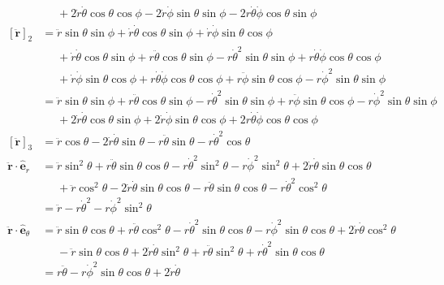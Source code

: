 \documentclass[12pt]{article}
\begin{document}
\begin{gather*}
\begin{aligned}
			&\phantom{=} 
				+ 2\dot{r}\dot{\theta}\cos\theta\cos\phi
				- 2\dot{r}\dot{\phi}\sin\theta\sin\phi 
				- 2r\dot{\theta}\dot{\phi}\cos\theta\sin\phi \\
		[\ddot{\mathbf{r}}]_2 &= 
			\ddot{r}\sin\theta\sin\phi + \dot{r}\dot{\theta}\cos\theta\sin\phi
				+ \dot{r}\dot{\phi}\sin\theta\cos\phi \\
			&\phantom{=} + \dot{r}\dot{\theta}\cos\theta\sin\phi 
				+ r\ddot{\theta}\cos\theta\sin\phi - r\dot{\theta}^2\sin\theta\sin\phi 
				+ r\dot{\theta}\dot{\phi}\cos\theta\cos\phi \\
			&\phantom{=}+ \dot{r}\dot{\phi}\sin\theta\cos\phi
				+ r\dot{\theta}\dot{\phi}\cos\theta\cos\phi 
				+ r\ddot{\phi}\sin\theta\cos\phi - r\dot{\phi}^2\sin\theta\sin\phi \\
		&= \ddot{r}\sin\theta\sin\phi 
				+ r\ddot{\theta}\cos\theta\sin\phi - r\dot{\theta}^2\sin\theta\sin\phi 
				+ r\ddot{\phi}\sin\theta\cos\phi - r\dot{\phi}^2\sin\theta\sin\phi  \\
			&\phantom{=} 
				+ 2\dot{r}\dot{\theta}\cos\theta\sin\phi
				+ 2\dot{r}\dot{\phi}\sin\theta\cos\phi 
				+ 2r\dot{\theta}\dot{\phi}\cos\theta\cos\phi \\
		[\ddot{\mathbf{r}}]_3 &= 
			\ddot{r}\cos\theta - 2\dot{r}\dot{\theta}\sin\theta 
			- r\ddot{\theta}\sin\theta - r\dot{\theta}^2\cos\theta \\
		\ddot{\mathbf{r}} \cdot \hat{\mathbf{e}}_r &= 
				\ddot{r}\sin^2\theta
				+ r\ddot{\theta}\sin\theta\cos\theta - r\dot{\theta}^2\sin^2\theta
				- r\dot{\phi}^2\sin^2\theta + 2\dot{r}\dot{\theta}\sin\theta\cos\theta \\
			&\phantom{=} 
				+ \ddot{r}\cos^2\theta - 2\dot{r}\dot{\theta}\sin\theta\cos\theta 
				- r\ddot{\theta}\sin\theta\cos\theta - r\dot{\theta}^2\cos^2\theta \\
			&= \ddot{r} - r\dot{\theta}^2 - r\dot{\phi}^2\sin^2\theta \\
		\ddot{\mathbf{r}} \cdot \hat{\mathbf{e}}_\theta &= 
				\ddot{r}\sin\theta\cos\theta
				+ r\ddot{\theta}\cos^2\theta - r\dot{\theta}^2\sin\theta\cos\theta
				- r\dot{\phi}^2\sin\theta\cos\theta + 2\dot{r}\dot{\theta}\cos^2\theta \\
			&\phantom{=} 
				-\ddot{r}\sin\theta\cos\theta + 2\dot{r}\dot{\theta}\sin^2\theta 
				+ r\ddot{\theta}\sin^2\theta + r\dot{\theta}^2\sin\theta\cos\theta \\
			&= r\ddot{\theta} - r\dot{\phi}^2\sin\theta\cos\theta +
				2\dot{r}\dot{\theta} \\

\end{aligned}
\end{gather*}
\end{document}
